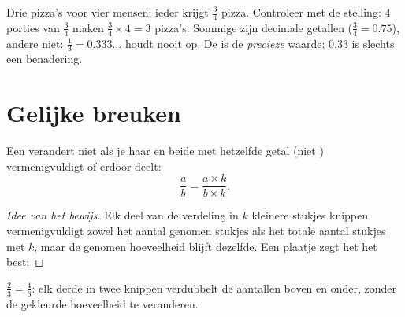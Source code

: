 \begin{example}\label{ex:g6:fractions:pizzas}
Drie pizza's voor vier mensen: ieder krijgt $\frac34$ pizza. Controleer met de
stelling: $4$ porties van $\frac34$ maken $\frac34 \times 4 = 3$ pizza's.
Sommige  zijn decimale getallen ($\frac34 = 0.75$), andere niet:
$\frac13 = 0.333\dots$ houdt nooit op. De  is de \emph{precieze} waarde;
$0.33$ is slechts een benadering.
\end{example}

\section{Gelijke breuken}

\begin{proposition}\label{prop:g6:fractions:equal}
Een  verandert niet als je haar  en  beide met hetzelfde
getal (niet ) vermenigvuldigt of erdoor deelt:
\[
\frac{a}{b} = \frac{a \times k}{b \times k} .
\]
\end{proposition}

\begin{proof}[Idee van het bewijs]
Elk deel van de verdeling in $k$ kleinere stukjes knippen vermenigvuldigt
zowel het aantal genomen stukjes als het totale aantal stukjes met $k$, maar
de genomen hoeveelheid blijft dezelfde. Een plaatje zegt het het best:
\end{proof}

\begin{omfigure}

{\small $\frac23 = \frac46$: elk derde in twee knippen verdubbelt de
aantallen boven en onder, zonder de gekleurde hoeveelheid te veranderen.}
\end{omfigure}


